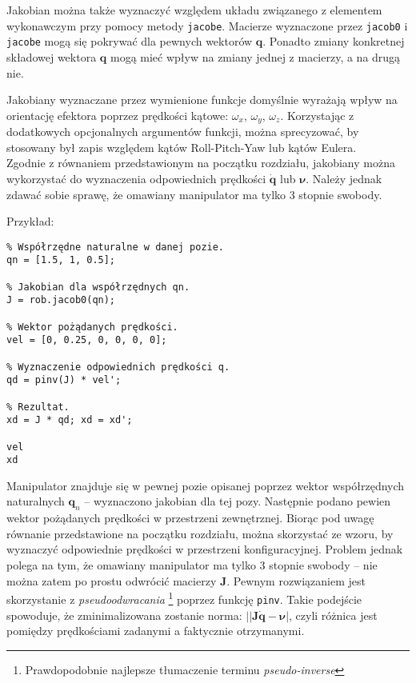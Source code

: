 \documentclass[11pt, a4paper]{article}
\begin{document}
Jakobian można także wyznaczyć względem układu związanego z elementem wykonawczym przy pomocy metody \texttt{jacobe}. Macierze wyznaczone przez \texttt{jacob0} i \texttt{jacobe} mogą się pokrywać dla pewnych wektorów $\mathbf{q}$. Ponadto zmiany konkretnej składowej wektora $\mathbf{q}$ mogą mieć wpływ na zmiany jednej z macierzy, a na drugą nie.

Jakobiany wyznaczane przez wymienione funkcje domyślnie wyrażają wpływ na orientację efektora poprzez prędkości kątowe: $\omega_x$, $\omega_y$, $\omega_z$. Korzystając z dodatkowych opcjonalnych argumentów funkcji, można sprecyzować, by stosowany był zapis względem kątów Roll-Pitch-Yaw lub kątów Eulera.\\

Zgodnie z równaniem przedstawionym na początku rozdziału, jakobiany można wykorzystać do wyznaczenia odpowiednich prędkości $\dot{\mathbf{q}}$ lub $\boldsymbol{\nu}$. Należy jednak zdawać sobie sprawę, że omawiany manipulator ma tylko 3 stopnie swobody.

Przykład:
\begin{lstlisting}
% Współrzędne naturalne w danej pozie.
qn = [1.5, 1, 0.5];

% Jakobian dla współrzędnych qn.
J = rob.jacob0(qn);

% Wektor pożądanych prędkości.
vel = [0, 0.25, 0, 0, 0, 0];

% Wyznaczenie odpowiednich prędkości q.
qd = pinv(J) * vel';

% Rezultat.
xd = J * qd; xd = xd';

vel
xd
\end{lstlisting}

Manipulator znajduje się w pewnej pozie opisanej poprzez wektor współrzędnych naturalnych $\mathbf{q}_n$ -- wyznaczono jakobian dla tej pozy. Następnie podano pewien wektor pożądanych prędkości w przestrzeni zewnętrznej. Biorąc pod uwagę równanie przedstawione na początku rozdziału, można skorzystać ze wzoru, by wyznaczyć odpowiednie prędkości w przestrzeni konfiguracyjnej. Problem jednak polega na tym, że omawiany manipulator ma tylko 3 stopnie swobody -- nie można zatem po prostu odwrócić macierzy $\mathbf{J}$. Pewnym rozwiązaniem jest skorzystanie z \emph{pseudoodwracania}%
\footnote{Prawdopodobnie najlepsze tłumaczenie terminu \emph{pseudo-inverse}}
poprzez funkcję \texttt{pinv}.
Takie podejście spowoduje, że zminimalizowana zostanie norma: $||\mathbf{J} \dot{\mathbf{q}} - \boldsymbol{\nu}|$, czyli różnica jest pomiędzy prędkościami zadanymi a faktycznie otrzymanymi.
\end{document}
